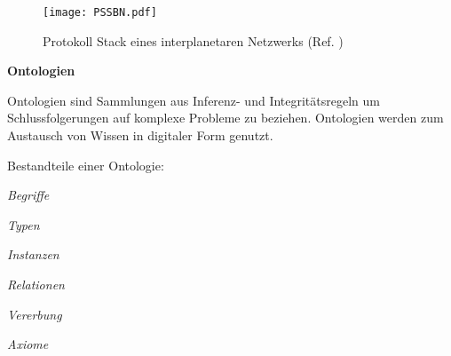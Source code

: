 \begin{figure}[H]
\centering
\texttt{[image: PSSBN.pdf]}
\caption{Protokoll Stack eines interplanetaren Netzwerks (Ref.
\cite{DTNBundle})}
\label{fig:PSSBN}
\end{figure}

\textbf{Ontologien}

Ontologien sind Sammlungen aus Inferenz- und Integrit{\"a}tsregeln um
Schlussfolgerungen auf komplexe Probleme zu beziehen. Ontologien werden zum
Austausch von Wissen in digitaler Form genutzt.

Bestandteile einer Ontologie:

 \begin{compactenum}[I]
     \item \textit{Begriffe}
     \item \textit{Typen}
     \item \textit{Instanzen}
     \item \textit{Relationen}
     \item \textit{Vererbung}
     \item \textit{Axiome}
   \end{compactenum}
